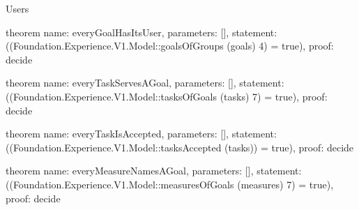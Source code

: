 \begin{lexlean}{Users}
\begin{semanticmodule}
theorem{
  name: everyGoalHasItsUser,
  parameters: [],
  statement: ((Foundation.Experience.V1.Model::goalsOfGroups (goals) 4) = true),
  proof: decide{}
}

theorem{
  name: everyTaskServesAGoal,
  parameters: [],
  statement: ((Foundation.Experience.V1.Model::tasksOfGoals (tasks) 7) = true),
  proof: decide{}
}

theorem{
  name: everyTaskIsAccepted,
  parameters: [],
  statement: ((Foundation.Experience.V1.Model::tasksAccepted (tasks)) = true),
  proof: decide{}
}

theorem{
  name: everyMeasureNamesAGoal,
  parameters: [],
  statement: ((Foundation.Experience.V1.Model::measuresOfGoals (measures) 7) = true),
  proof: decide{}
}
\end{semanticmodule}
\end{lexlean}
